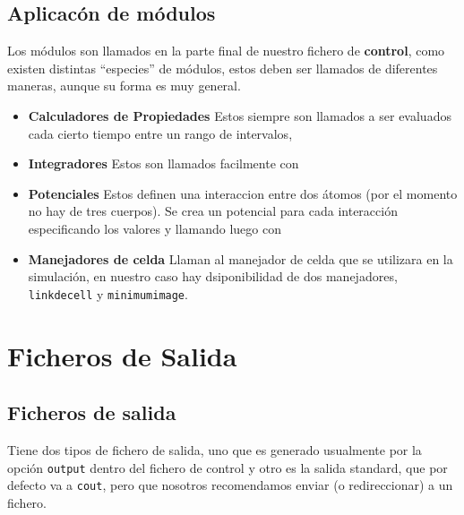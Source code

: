 \subsection{Aplicac\'on de m\'odulos}

Los m\'odulos son llamados en la parte final de nuestro fichero de \textbf{control}, como existen distintas ``especies'' de m\'odulos, estos deben ser llamados de diferentes maneras, aunque su forma es muy general.

\begin{itemize}
 \item \textbf{Calculadores de Propiedades}
  Estos siempre son llamados a ser evaluados cada cierto tiempo entre un rango de intervalos, 
 \item \textbf{Integradores}
  Estos son llamados facilmente con
 \item \textbf{Potenciales}
  Estos definen una interaccion entre dos \'atomos (por el momento no hay de tres cuerpos). Se crea un potencial para cada interacci\'on especificando los valores y llamando luego con
 \item \textbf{Manejadores de celda}
  Llaman al manejador de celda que se utilizara en la simulaci\'on, en nuestro caso hay dsiponibilidad de dos manejadores, \verb|linkdecell| y \verb|minimumimage|.
\end{itemize}




\section{Ficheros de Salida}

\subsection{Ficheros de salida}
\lpmd Tiene dos tipos de fichero de salida, uno que es generado usualmente por la opci\'on \verb|output| dentro del fichero de control y otro es la salida standard, que por defecto va a \verb|cout|, pero que nosotros recomendamos enviar (o redireccionar) a un fichero.

